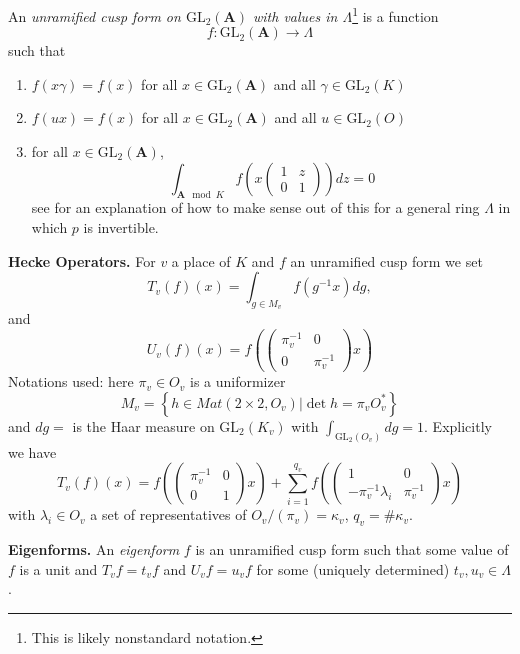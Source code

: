 \begin{definition}
\label{definition-unramified}
An {\it unramified cusp form on $\text{GL}_2(\mathbf{A})$ with values in
$\Lambda$}\footnote{This is likely nonstandard notation.}
is a function
$$
f : \text{GL}_2(\mathbf{A}) \to \Lambda
$$
such that
\begin{enumerate}
\item $f(x\gamma) = f(x)$ for all $x\in \text{GL}_2(\mathbf{A})$ and all
$\gamma\in \text{GL}_2(K)$
\item $f(ux) = f(x)$ for all $x\in \text{GL}_2(\mathbf{A})$ and all
$u\in \text{GL}_2(O)$
\item for all $x\in \text{GL}_2(\mathbf{A})$,
$$
\int_{\mathbf{A} \mod K} f
\left(x
\left(
\begin{matrix}
1 & z \\
0 & 1
\end{matrix}
\right)
\right) dz = 0
$$
see \cite[Section 4.1]{dJ-conjecture}
for an explanation of how to make sense out
of this for a general ring $\Lambda$ in which $p$ is invertible.
\end{enumerate}
\end{definition}

\noindent
{\bf Hecke Operators.}
For $v$ a place of $K$ and $f$ an unramified cusp form we set
$$
T_v(f)(x) =
\int_{g\in M_v}f(g^{-1}x)dg,
$$
and
$$
U_v(f)(x) =
f\left(
\left(
\begin{matrix}
\pi_v^{-1} & 0 \\
0 & \pi_v^{-1}
\end{matrix}
\right)x\right)
$$
Notations used: here $\pi_v \in O_v$ is a uniformizer
$$
M_v =
\left\{
h\in Mat(2\times 2, O_v) | \det h = \pi_vO_v^*\right\}
$$
and $dg = $ is the Haar measure on $\text{GL}_2(K_v)$ with
$\int_{\text{GL}_2(O_v)} dg = 1$. Explicitly we have
$$
T_v(f)(x) =
f\left(
\left(
\begin{matrix}
\pi_v^{-1}& 0 \\
0 & 1
\end{matrix}
\right)
x\right) +
\sum_{i = 1}^{q_v}
f\left(\left(
\begin{matrix}
1 & 0 \\
-\pi_v^{-1}\lambda_i
& \pi_v^{-1}
\end{matrix}
\right) x\right)
$$
with $\lambda_i\in O_v$ a set of representatives of
$O_v/(\pi_v)=\kappa_v$, $q_v = \#\kappa_v$.

\medskip\noindent
{\bf Eigenforms.} An {\it eigenform} $f$ is an unramified cusp form
such that some value of $f$ is a unit and $T_vf = t_vf$ and
$U_vf = u_vf$ for some (uniquely determined) $t_v, u_v \in \Lambda$.

